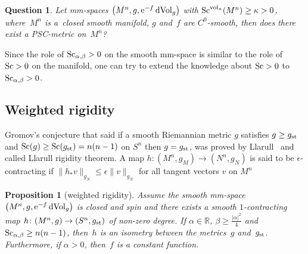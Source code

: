 \documentclass[pdftex]{sigma}
\newtheorem{Question}[Theorem]{Question}
\newtheorem{Proposition}[Theorem]{Proposition}
\begin{document}
\begin{Question}Let mm-spaces $\big(M^n,g, {\rm e}^{-f}\,{\rm dVol}_{g}\big)$ with ${\rm Sc}^{{\rm vol}_n}(M^n)\geq \kappa>0$, where~$M^n$ is a~closed smooth manifold, $g$ and~$f$ are $C^0$-smooth, then does there exist a PSC-metric on~$M^n$?
\end{Question}

Since the role of ${\rm Sc}_{\alpha, \beta}>0$ on the smooth mm-space is similar to the role of ${\rm Sc}>0$ on the manifold, one can try to extend the knowledge about ${\rm Sc}>0$ to ${\rm Sc}_{\alpha, \beta}>0$.

\subsection{Weighted rigidity}
Gromov's conjecture that said if a smooth Riemannian metric $g$ satisfies $g\geq g_{\rm st}$ and ${\rm Sc}(g)\geq {\rm Sc}(g_{\rm st})=n(n-1)$ on $S^n$ then $g=g_{\rm st}$, was proved by Llarull~\cite{MR1600027} and called Llarull rigidity theorem. A map $h\colon (M^n, g_M)\to (N^n, g_N)$ is said to be $\epsilon$-contracting if $\|h_*v\|_{g_N}\leq \epsilon\|v\|_{g_N}$ for all tangent vectors $v$ on $M^n$

\begin{Proposition}[weighted rigidity] Assume the smooth mm-space $\big(M^n,g, {\rm e}^{-f}\,{\rm dVol}_{g}\big)$ is closed and spin and there exists a smooth $1$-contracting map $h\colon (M^n, g)\to (S^n, g_{\rm st})$ of non-zero degree. If $\alpha \in \mathbb{R}$, $\beta \geq \frac{|\alpha|^2}{4}$ and ${\rm Sc}_{\alpha, \beta}\geq n(n-1)$, then~$h$ is an isometry between the metrics~$g$ and~$g_{\rm st}$. Furthermore, if $\alpha> 0$, then~$f$ is a constant function.
\end{Proposition}
\end{document}
